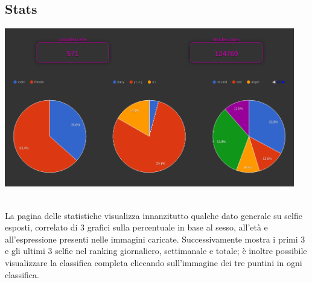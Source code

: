 \documentclass{article}
\begin{document}
\subsection{Stats}
\begin{center}\includegraphics[width=0.95\textwidth]{res/stat.png}\end{center}\\
La pagina delle statistiche visualizza innanzitutto qualche dato generale su selfie esposti, correlato di 3 grafici sulla
percentuale in base al sesso, all'età e all'espressione presenti nelle immagini caricate.
Successivamente mostra i primi 3 e gli ultimi 3 selfie nel ranking giornaliero, settimanale e totale; è inoltre possibile
visualizzare la classifica completa cliccando sull'immagine dei tre puntini in ogni classifica.
\end{document}
